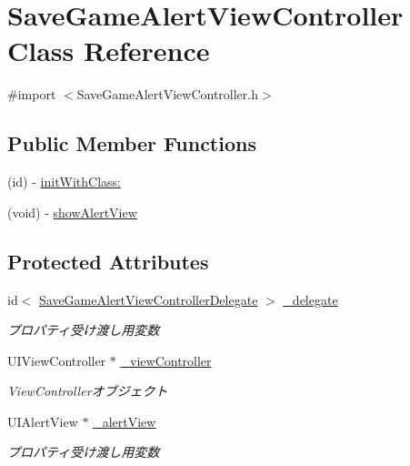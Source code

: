 \hypertarget{interface_save_game_alert_view_controller}{
\section{SaveGameAlertViewController Class Reference}
\label{interface_save_game_alert_view_controller}
}


{\ttfamily \#import $<$SaveGameAlertViewController.h$>$}

\subsection*{Public Member Functions}
\begin{DoxyCompactItemize}
\item 
(id) -\/ \hyperlink{interface_save_game_alert_view_controller_a2b581b1f64ef945d7aa02752c22eeb75}{initWithClass:}
\item 
(void) -\/ \hyperlink{interface_save_game_alert_view_controller_a920741cbfeb15ff30a5ecf3bedf14b1d}{showAlertView}
\end{DoxyCompactItemize}
\subsection*{Protected Attributes}
\begin{DoxyCompactItemize}
\item 
\hypertarget{interface_save_game_alert_view_controller_a8fff5156d7b947f417efcc3e110dc976}{
id$<$ \hyperlink{protocol_save_game_alert_view_controller_delegate-p}{SaveGameAlertViewControllerDelegate} $>$ \hyperlink{interface_save_game_alert_view_controller_a8fff5156d7b947f417efcc3e110dc976}{\_\-delegate}}
\label{interface_save_game_alert_view_controller_a8fff5156d7b947f417efcc3e110dc976}

\begin{DoxyCompactList}\small\item\em プロパティ受け渡し用変数 \end{DoxyCompactList}\item 
\hypertarget{interface_save_game_alert_view_controller_a98cb5ac9bca128c5817627e40f2e96b3}{
UIViewController $\ast$ \hyperlink{interface_save_game_alert_view_controller_a98cb5ac9bca128c5817627e40f2e96b3}{\_\-viewController}}
\label{interface_save_game_alert_view_controller_a98cb5ac9bca128c5817627e40f2e96b3}

\begin{DoxyCompactList}\small\item\em ViewControllerオブジェクト \end{DoxyCompactList}\item 
\hypertarget{interface_save_game_alert_view_controller_af2a8c9c258bcc8157de2aeac82c76834}{
UIAlertView $\ast$ \hyperlink{interface_save_game_alert_view_controller_af2a8c9c258bcc8157de2aeac82c76834}{\_\-alertView}}
\label{interface_save_game_alert_view_controller_af2a8c9c258bcc8157de2aeac82c76834}

\begin{DoxyCompactList}\small\item\em プロパティ受け渡し用変数 \end{DoxyCompactList}\end{DoxyCompactItemize}
